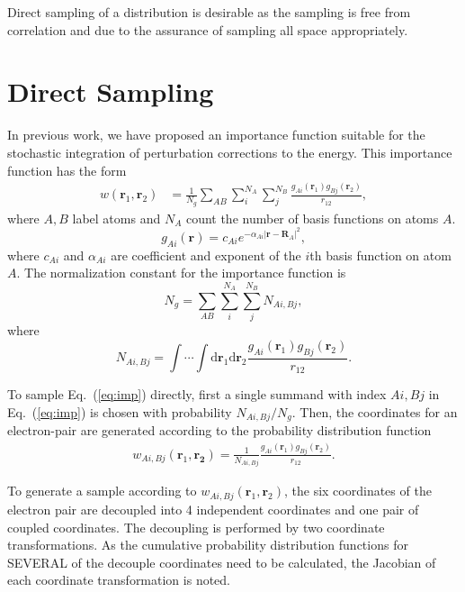 \documentclass{revtex4}
\begin{document}
Direct sampling of a distribution is desirable as the sampling is free from correlation and due to the assurance of sampling all space appropriately.

\section{Direct Sampling}
  In previous work, we have proposed an importance function suitable for the stochastic integration of perturbation corrections to the energy.
  This importance function has the form
  \begin{align}
    w(\mathbf{r}_1, \mathbf{r}_2)
    &= \frac{1}{N_g}\sum_{AB}\sum_{i}^{N_A}\sum_j^{N_B}\frac{g_{Ai}(\mathbf{r}_1)g_{Bj}(\mathbf{r}_2)}{r_{12}},
    \label{eq:imp}
  \end{align}
  where $A, B$ label atoms and $N_A$ count the number of basis functions on atoms $A$.
  \begin{equation}
    g_{Ai}(\mathbf{r}) = c_{Ai} e^{-\alpha_{Ai}|\mathbf{r}-\mathbf{R}_A|^2},
  \end{equation}
  where $c_{Ai}$ and $\alpha_{Ai}$ are coefficient and exponent of the $i$th basis function on atom $A$.
  The normalization constant for the importance function is
  \begin{equation}
    N_g = \sum_{AB}\sum_{i}^{N_A}\sum_j^{N_B} N_{Ai,Bj},
  \end{equation}
  where 
  \begin{equation}
     N_{Ai,Bj} = \int \cdots \int \mathrm{d}\mathbf{r}_1 \mathrm{d}\mathbf{r}_2 \frac{g_{Ai}(\mathbf{r}_1)g_{Bj}(\mathbf{r}_2)}{r_{12}}.
    \label{eq:impTerm}
  \end{equation}

  To sample Eq.\ (\ref{eq:imp}) directly, first a single summand with index $Ai, Bj$ in Eq.\ (\ref{eq:imp}) is chosen with probability $N_{Ai,Bj}/N_g$.
  Then, the coordinates for an electron-pair are generated according to the probability distribution function
  \begin{align}
     w_{Ai,Bj}(\mathbf{r}_1, \mathbf{r_2}) = \frac{1}{N_{Ai, Bj}} \frac{g_{Ai}(\mathbf{r}_1)g_{Bj}(\mathbf{r}_2)}{r_{12}}.
     \label{eq:sgl_imp}
  \end{align}

  To generate a sample according to $w_{Ai,Bj}(\mathbf{r}_1, \mathbf{r}_2)$, the six coordinates of the electron pair are decoupled into 4 independent coordinates and one pair of coupled
  coordinates. The decoupling is performed by two coordinate transformations.
  As the cumulative probability distribution functions for SEVERAL of the decouple coordinates need to be calculated, the Jacobian of each coordinate transformation is noted.
  
\end{document}
